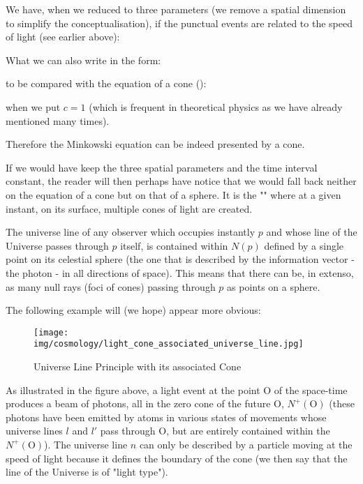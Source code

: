 	We have, when we reduced to three parameters (we remove a spatial dimension to simplify the conceptualisation), if the punctual events are related to the speed of light (see earlier above):
	
	What we can also write in the form:
	
	to be compared with the equation of a cone ():
	
	when we put $c = 1$ (which is frequent in theoretical physics as we have already mentioned many times).

	Therefore the Minkowski equation can be indeed presented by a cone.
	\begin{tcolorbox}[title=Remark,colframe=black,arc=10pt]
	If we would have keep the three spatial parameters and the time interval constant, the reader will then perhaps have notice that we would fall back neither on the equation of a cone but on that of a sphere. It is the "" where at a given instant, on its surface, multiple cones of light are created.
	\end{tcolorbox}
	The universe line of any observer which occupies instantly $p$ and whose line of the Universe passes through $p$ itself, is contained within $N(p)$ defined by a single point on its celestial sphere (the one that is described by the information vector - the photon - in all directions of space). This means that there can be, in extenso, as many null rays (foci of cones) passing through $p$ as points on a sphere.

	The following example will (we hope) appear more obvious:
	\begin{figure}[H]
		\centering
		\texttt{[image: img/cosmology/light\_cone\_associated\_universe\_line.jpg]}
		\caption{Universe Line Principle with its associated Cone}	
	\end{figure}
	As illustrated in the figure above, a light event at the point O of the space-time produces a beam of photons, all in the zero cone of the future O, $N^{+}(\text{O})$ (these photons have been emitted by atoms in various states of movements whose universe lines $l$ and $l'$ pass through O, but are entirely contained within the $N^{+}(\text{O})$). The universe line $n$ can only be described by a particle moving at the speed of light because it defines the boundary of the cone (we then say that the line of the Universe is of "light type").
	
